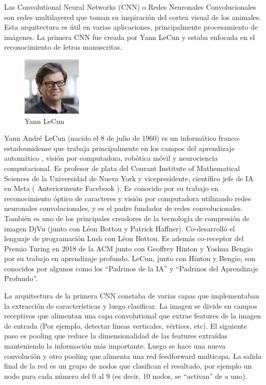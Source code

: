\documentclass[a4paper]{article}
\begin{document}
Las Convolutional Neural Networks (CNN) o Redes Neuronales Convolucionales 
son redes multilayered que toman 
su inspiración del cortex visual de los animales. Esta 
arquitectura es útil en varias aplicaciones, principalmente 
procesamiento de imágenes. La primera CNN fue creada por Yann 
LeCun y estaba enfocada en el reconocimiento de letras 
manuscritas.

\begin{figure} %
    \centering
    \includegraphics[width=0.25\textwidth]{./images/Yann_LeCun.jpeg}
    \caption{Yann LeCun}
\end{figure}

Yann André LeCun (nacido el 8 de julio de 1960) es un informático 
franco-estadounidense que trabaja principalmente en los campos del 
aprendizaje automático , visión por computadora, robótica móvil y 
neurociencia computacional. Es profesor de plata del Courant 
Institute of Mathematical Sciences de la Universidad de Nueva York 
y vicepresidente, científico jefe de IA en Meta ( Anteriormente 
Facebook ).
\newpage
Es conocido por su trabajo en reconocimiento óptico de caracteres 
y visión por computadora utilizando redes neuronales 
convolucionales, y es el padre fundador de redes 
convolucionales. También es uno de los principales creadores de la 
tecnología de compresión de imagen DjVu (junto con Léon Bottou y 
Patrick Haffner). Co-desarrolló el lenguaje de programación Lush 
con Léon Bottou. Es además co-receptor del Premio Turing en 2018 de la ACM junto con 
Geoffrey Hinton y Yoshua Bengio por su trabajo en aprendizaje 
profundo. LeCun, junto con Hinton y Bengio, son conocidos por algunos como 
los ``Padrinos de la IA'' y ``Padrinos del Aprendizaje Profundo''. 

La arquitectura de la primera CNN constaba de varias capas que 
implementaban la extracción de características y luego clasificar. 
La imagen se divide en campos receptivos que alimentan una capa 
convolutional que extrae features de la imagen de entrada (Por 
ejemplo, detectar lineas verticales, vértices, etc). El siguiente 
paso es pooling que reduce la dimensionalidad de las features 
extraídas manteniendo la información más importante. Luego se hace 
una nueva convolución y otro pooling que alimenta una red 
feedforward multicapa. La salida final de la red es un grupo de 
nodos que clasifican el resultado, por ejemplo un nodo para cada 
número del 0 al 9 (es decir, 10 nodos, se ``activan'' de a uno).
\end{document}
